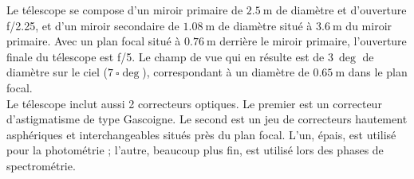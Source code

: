 Le télescope se compose d'un miroir primaire de $\SI{2,5}{\meter}$ de diamètre et d'ouverture f/\num{2,25}, et d'un miroir secondaire de $\SI{1,08}{\meter}$ de diamètre situé à $\SI{3,6}{\meter}$ du miroir primaire. Avec un plan focal situé à $\SI{0,76}{\meter}$ derrière le miroir primaire, l'ouverture finale du télescope est f/5. Le champ de vue qui en résulte est de $\SI{3}{\deg}$ de diamètre sur le ciel ($\SI{7}{\square\deg}$), correspondant à un diamètre de $\SI{0,65}{\meter}$ dans le plan focal. \\
Le télescope inclut aussi 2 correcteurs optiques. Le premier est un correcteur d'astigmatisme de type Gascoigne. Le second est un jeu de correcteurs hautement asphériques et interchangeables situés près du plan focal. L'un, épais, est utilisé pour la photométrie ; l'autre, beaucoup plus fin, est utilisé lors des phases de spectrométrie.



